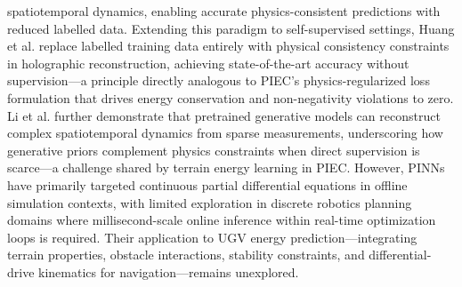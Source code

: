 \documentclass[pdflatex,sn-nature]{sn-jnl}%
\begin{document}
spatiotemporal dynamics, enabling accurate physics-consistent predictions with reduced labelled data. Extending this paradigm to self-supervised settings, Huang et al.\cite{huang2023self} replace labelled training data entirely with physical consistency constraints in holographic reconstruction, achieving state-of-the-art accuracy without supervision---a principle directly analogous to PIEC's physics-regularized loss formulation that drives energy conservation and non-negativity violations to zero. Li et al.\cite{li2024learning} further demonstrate that pretrained generative models can reconstruct complex spatiotemporal dynamics from sparse measurements, underscoring how generative priors complement physics constraints when direct supervision is scarce---a challenge shared by terrain energy learning in PIEC. However, PINNs have primarily targeted continuous partial differential equations in offline simulation contexts, with limited exploration in discrete robotics planning domains where millisecond-scale online inference within real-time optimization loops is required. Their application to UGV energy prediction—integrating terrain properties, obstacle interactions, stability constraints, and differential-drive kinematics for navigation—remains unexplored.
\end{document}
